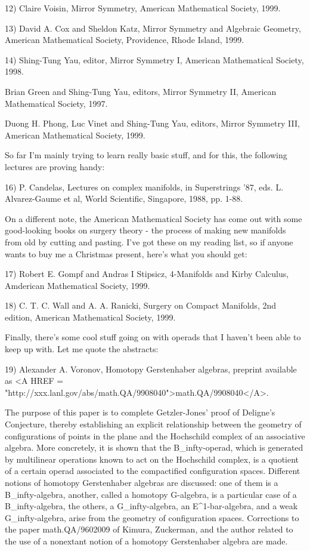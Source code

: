 12) Claire Voisin, Mirror Symmetry, American Mathematical Society, 1999.

13) David A. Cox and Sheldon Katz, Mirror Symmetry and Algebraic Geometry,
American Mathematical Society, Providence, Rhode Island, 1999.

14) Shing-Tung Yau, editor, Mirror Symmetry I, American Mathematical
Society, 1998.

Brian Green and Shing-Tung Yau, editors, Mirror Symmetry II, American
Mathematical Society, 1997.

Duong H. Phong, Luc Vinet and Shing-Tung Yau, editors, Mirror Symmetry III, 
American Mathematical Society, 1999.

So far I'm mainly trying to learn really basic stuff, and for this, 
the following lectures are proving handy:

16) P. Candelas, Lectures on complex manifolds, in Superstrings '87, 
eds. L. Alvarez-Gaume et al, World Scientific, Singapore, 1988, pp. 1-88.

On a different note, the American Mathematical Society has come out
with some good-looking books on surgery theory - the process of making
new manifolds from old by cutting and pasting.  I've got these on
my reading list, so if anyone wants to buy me a Christmas present, 
here's what you should get:

17) Robert E. Gompf and Andras I Stipsicz, 4-Manifolds and Kirby Calculus,
Amderican Mathematical Society, 1999.

18) C. T. C. Wall and A. A. Ranicki, Surgery on Compact Manifolds, 
2nd edition, American Mathematical Society, 1999.

Finally, there's some cool stuff going on with operads that I haven't 
been able to keep up with.  Let me quote the abstracts:

19) Alexander A. Voronov, Homotopy Gerstenhaber algebras, preprint
available as 
<A HREF = "http://xxx.lanl.gov/abs/math.QA/9908040">math.QA/9908040</A>.

The purpose of this paper is to complete Getzler-Jones' proof of Deligne's 
Conjecture, thereby establishing an explicit relationship between the 
geometry of configurations of points in the plane and the Hochschild 
complex of an associative algebra.  More concretely, it is shown that 
the B_infty-operad, which is generated by multilinear operations known to
act on the Hochschild complex, is a quotient of a certain operad associated 
to the compactified configuration spaces.  Different notions of homotopy 
Gerstenhaber algebras are discussed: one of them is a B_infty-algebra, 
another, called a homotopy G-algebra, is a particular case of a 
B_infty-algebra, the others, a G_infty-algebra, an E^1-bar-algebra, and 
a weak G_infty-algebra, arise from the geometry of configuration spaces. 
Corrections to the paper math.QA/9602009 of Kimura, Zuckerman, and the 
author related to the use of a nonextant notion of a homotopy Gerstenhaber 
algebra are made. 


